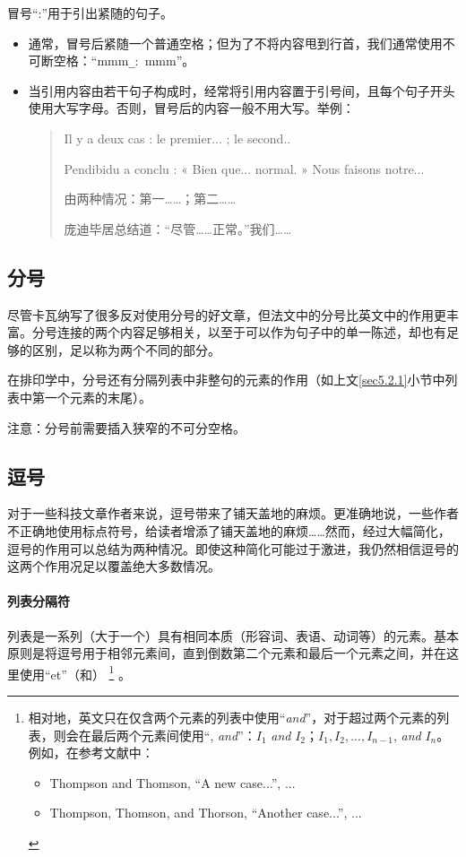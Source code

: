 冒号“:”用于引出紧随的句子。

\begin{itemize}
    \item 通常，冒号后紧随一个普通空格；但为了不将内容甩到行首，我们通常使用不可断空格：“mmm\verb|_|:\verb*+ +mmm”。
    \item 当引用内容由若干句子构成时，经常将引用内容置于引号间，且每个句子开头使用大写字母。否则，冒号后的内容一般不用大写。举例：
    
    \begin{quote}
        Il y a deux cas : le premier... ; le second..
        
        Pendibidu a conclu : « Bien que... normal. » Nous faisons notre...

        \begin{bil}
            由两种情况：第一……；第二……

            庞迪毕居总结道：“尽管……正常。”我们……
        \end{bil}
    \end{quote}
\end{itemize}

\subsection{分号}

尽管卡瓦纳写了很多反对使用分号的好文章，但法文中的分号比英文中的作用更丰富。分号连接的两个内容足够相关，以至于可以作为句子中的单一陈述，却也有足够的区别，足以称为两个不同的部分。

在排印学中，分号还有分隔列表中非整句的元素的作用（如上文\ref{sec5.2.1}小节中列表中第一个元素的末尾）。

注意：分号前需要插入狭窄的不可分空格。

\subsection{逗号}

对于一些科技文章作者来说，逗号带来了铺天盖地的麻烦。更准确地说，一些作者不正确地使用标点符号，给读者增添了铺天盖地的麻烦……然而，经过大幅简化，逗号的作用可以总结为两种情况。即使这种简化可能过于激进，我仍然相信逗号的这两个作用况足以覆盖绝大多数情况。

\paragraph{列表分隔符} 列表是一系列（大于一个）具有相同本质（形容词、表语、动词等）的元素。基本原则是将逗号用于相邻元素间，直到倒数第二个元素和最后一个元素之间，并在这里使用“et”（和）
    \footnote{相对地，英文只在仅含两个元素的列表中使用“\emph{and}”，对于超过两个元素的列表，则会在最后两个元素间使用“, \emph{and}”：$I_1$ \emph{and} $I_2$；$I_1, I_2, ... , I_{n-1}$, \emph{and} $I_n$。例如，在参考文献中：
    \begin{itemize}
        \item Thompson and Thomson, “A new case...”, ...
        \item Thompson, Thomson, and Thorson, “Another case...”, ...
    \end{itemize}
    }
。


